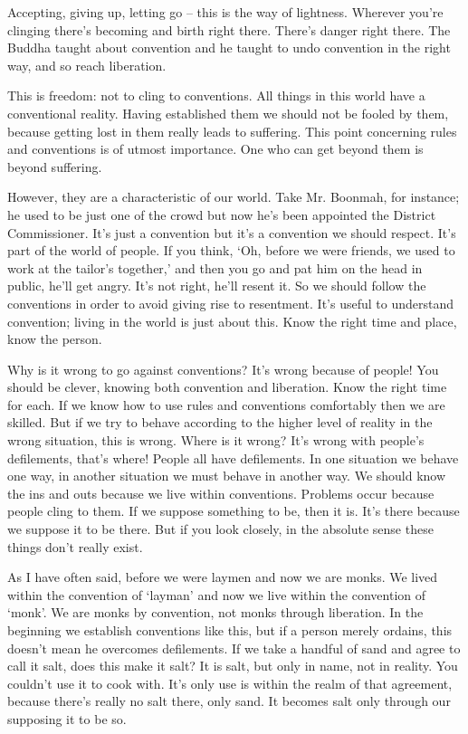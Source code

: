 Accepting, giving up, letting go -- this is the way of lightness. Wherever you're clinging there's becoming and birth right there. There's danger right there. The Buddha taught about convention and he taught to undo convention in the right way, and so reach liberation.

This is freedom: not to cling to conventions. All things in this world have a conventional reality. Having established them we should not be fooled by them, because getting lost in them really leads to suffering. This point concerning rules and conventions is of utmost importance. One who can get beyond them is beyond suffering.

However, they are a characteristic of our world. Take Mr. Boonmah, for instance; he used to be just one of the crowd but now he's been appointed the District Commissioner. It's just a convention but it's a convention we should respect. It's part of the world of people. If you think, `Oh, before we were friends, we used to work at the tailor's together,' and then you go and pat him on the head in public, he'll get angry. It's not right, he'll resent it. So we should follow the conventions in order to avoid giving rise to resentment. It's useful to understand convention; living in the world is just about this. Know the right time and place, know the person.

Why is it wrong to go against conventions? It's wrong because of people! You should be clever, knowing both convention and liberation. Know the right time for each. If we know how to use rules and conventions comfortably then we are skilled. But if we try to behave according to the higher level of reality in the wrong situation, this is wrong. Where is it wrong? It's wrong with people's defilements, that's where! People all have defilements. In one situation we behave one way, in another situation we must behave in another way. We should know the ins and outs because we live within conventions. Problems occur because people cling to them. If we suppose something to be, then it is. It's there because we suppose it to be there. But if you look closely, in the absolute sense these things don't really exist.

As I have often said, before we were laymen and now we are monks. We lived within the convention of `layman' and now we live within the convention of `monk'. We are monks by convention, not monks through liberation. In the beginning we establish conventions like this, but if a person merely ordains, this doesn't mean he overcomes defilements. If we take a handful of sand and agree to call it salt, does this make it salt? It is salt, but only in name, not in reality. You couldn't use it to cook with. It's only use is within the realm of that agreement, because there's really no salt there, only sand. It becomes salt only through our supposing it to be so.

